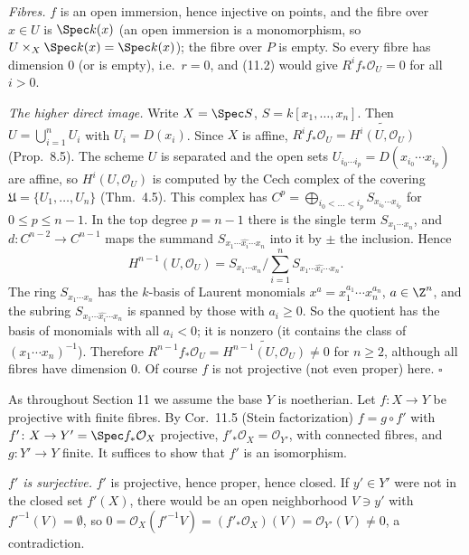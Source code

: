\documentclass[11pt]{article}
\begin{document}
\emph{Fibres.} $f$ is an open immersion, hence injective on points, and the fibre over $x\in U$ is $\Spec k(x)$ (an open immersion is a monomorphism, so $U\times_X\Spec k(x)=\Spec k(x)$); the fibre over $P$ is empty. So every fibre has dimension $0$ (or is empty), i.e.\ $r=0$, and (11.2) would give $R^if_*\mathcal O_U=0$ for all $i>0$.

\emph{The higher direct image.} Write $X=\Spec S$, $S=k[x_1,\dots,x_n]$. Then $U=\bigcup_{i=1}^nU_i$ with $U_i=D(x_i)$. Since $X$ is affine, $R^if_*\mathcal O_U=\widetilde{H^i(U,\mathcal O_U)}$ (Prop.~8.5). The scheme $U$ is separated and the open sets $U_{i_0\cdots i_p}=D(x_{i_0}\cdots x_{i_p})$ are affine, so $H^i(U,\mathcal O_U)$ is computed by the Cech complex of the covering $\mathfrak U=\{U_1,\dots,U_n\}$ (Thm.~4.5). This complex has $C^p=\bigoplus_{i_0<\dots<i_p}S_{x_{i_0}\cdots x_{i_p}}$ for $0\le p\le n-1$. In the top degree $p=n-1$ there is the single term $S_{x_1\cdots x_n}$, and $d\colon C^{n-2}\to C^{n-1}$ maps the summand $S_{x_1\cdots\widehat{x_i}\cdots x_n}$ into it by $\pm$ the inclusion. Hence
\[
H^{n-1}(U,\mathcal O_U)=S_{x_1\cdots x_n}\Big/\sum_{i=1}^nS_{x_1\cdots\widehat{x_i}\cdots x_n}.
\]
The ring $S_{x_1\cdots x_n}$ has the $k$-basis of Laurent monomials $x^a=x_1^{a_1}\cdots x_n^{a_n}$, $a\in\Z^n$, and the subring $S_{x_1\cdots\widehat{x_i}\cdots x_n}$ is spanned by those with $a_i\ge0$. So the quotient has the basis of monomials with all $a_i<0$; it is nonzero (it contains the class of $(x_1\cdots x_n)^{-1}$). Therefore $R^{n-1}f_*\mathcal O_U=\widetilde{H^{n-1}(U,\mathcal O_U)}\ne0$ for $n\ge 2$, although all fibres have dimension $0$. Of course $f$ is not projective (not even proper) here. \hfill$\square$

\pf
As throughout Section 11 we assume the base $Y$ is noetherian. Let $f\colon X\to Y$ be projective with finite fibres. By Cor.~11.5 (Stein factorization) $f=g\circ f'$ with $f'\colon X\to Y'=\Spec f_*\mathcal O_X$ projective, $f'_*\mathcal O_{X}=\mathcal O_{Y'}$, with connected fibres, and $g\colon Y'\to Y$ finite. It suffices to show that $f'$ is an isomorphism.

\emph{$f'$ is surjective.} $f'$ is projective, hence proper, hence closed. If $y'\in Y'$ were not in the closed set $f'(X)$, there would be an open neighborhood $V\ni y'$ with $f'^{-1}(V)=\emptyset$, so $0=\mathcal O_X(f'^{-1}V)=(f'_*\mathcal O_X)(V)=\mathcal O_{Y'}(V)\ne0$, a contradiction.
\end{document}
